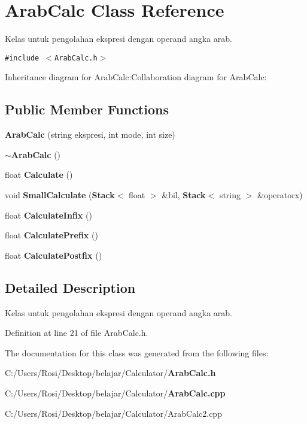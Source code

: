 \section{Arab\-Calc Class Reference}
\label{class_arab_calc}
Kelas untuk pengolahan ekspresi dengan operand angka arab.  


{\tt \#include $<$Arab\-Calc.h$>$}

Inheritance diagram for Arab\-Calc:Collaboration diagram for Arab\-Calc:\subsection*{Public Member Functions}
\begin{CompactItemize}
\item 
{\bf Arab\-Calc} (string ekspresi, int mode, int size)\label{class_arab_calc_b8753fcf7122ff1c02af495cd391ec04}

\item 
{\bf $\sim$Arab\-Calc} ()\label{class_arab_calc_3f083162c86a86c8f5039f4c1e033e4e}

\item 
float {\bf Calculate} ()\label{class_arab_calc_ef3b608a0cfab3929e1afe02afe9e580}

\item 
void {\bf Small\-Calculate} ({\bf Stack}$<$ float $>$ \&bil, {\bf Stack}$<$ string $>$ \&operatorx)\label{class_arab_calc_39d423c5d2e7a2c63c57b26c42a65915}

\item 
float {\bf Calculate\-Infix} ()\label{class_arab_calc_39a440cd99043f8ef3809d8191620779}

\item 
float {\bf Calculate\-Prefix} ()\label{class_arab_calc_968d7f0f8876ad0fb9a25576e0f0e7c6}

\item 
float {\bf Calculate\-Postfix} ()\label{class_arab_calc_81d5c7f43d3de276cafd11096ec6204c}

\end{CompactItemize}


\subsection{Detailed Description}
Kelas untuk pengolahan ekspresi dengan operand angka arab. 



Definition at line 21 of file Arab\-Calc.h.

The documentation for this class was generated from the following files:\begin{CompactItemize}
\item 
C:/Users/Rosi/Desktop/belajar/Calculator/{\bf Arab\-Calc.h}\item 
C:/Users/Rosi/Desktop/belajar/Calculator/{\bf Arab\-Calc.cpp}\item 
C:/Users/Rosi/Desktop/belajar/Calculator/Arab\-Calc2.cpp\end{CompactItemize}
